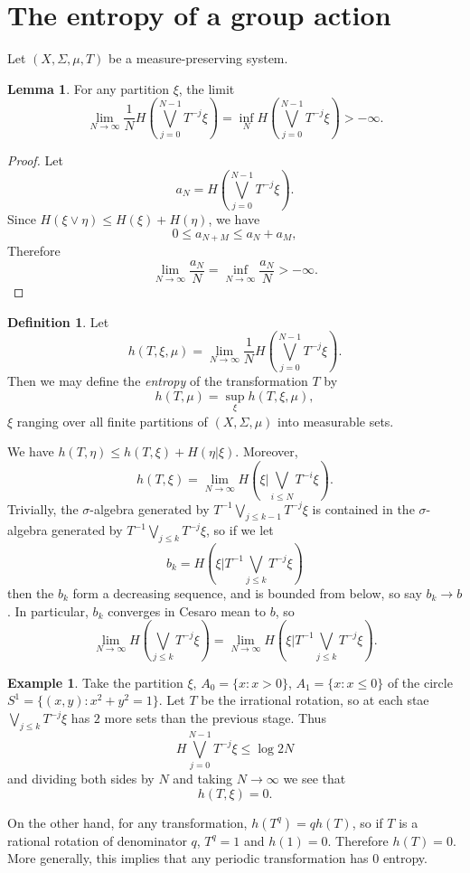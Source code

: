 \documentclass[12pt]{report}
\newcommand{\dfn}[1]{\emph{#1}\index{#1}}
\theoremstyle{definition}
\newtheorem{lemma}[theorem]{Lemma}
\newtheorem{definition}[theorem]{Definition}
\newtheorem{example}[theorem]{Example}
\begin{document}
\section{The entropy of a group action}
Let $(X, \Sigma, \mu, T)$ be a measure-preserving system.
\begin{lemma}
For any partition $\xi$, the limit
$$\lim_{N \to \infty} \frac{1}{N} H\left(\bigvee_{j=0}^{N-1} T^{-j}\xi\right) = \inf_N H\left(\bigvee_{j=0}^{N-1} T^{-j}\xi\right) > -\infty.
$$
\end{lemma}
\begin{proof}
Let
$$a_N = H\left(\bigvee_{j=0}^{N-1} T^{-j}\xi\right).$$
Since $H(\xi \vee \eta) \leq H(\xi) + H(\eta)$, we have
$$0 \leq a_{N+M} \leq a_N + a_M,$$
Therefore
$$\lim_{N \to \infty} \frac{a_N}{N} = \inf_{N \to \infty} \frac{a_N}{N} > -\infty.$$
\end{proof}

\begin{definition}
Let
$$h(T, \xi, \mu) = \lim_{N \to \infty} \frac{1}{N}H\left(\bigvee_{j=0}^{N-1} T^{-j}\xi\right).$$
Then we may define the \dfn{entropy} of the transformation $T$ by
$$h(T, \mu) = \sup_\xi h(T, \xi, \mu),$$
$\xi$ ranging over all finite partitions of $(X, \Sigma, \mu)$ into measurable sets.
\end{definition}
We have $h(T, \eta) \leq h(T, \xi) + H(\eta|\xi)$. Moreover,
$$h(T, \xi) = \lim_{N \to \infty} H(\xi|\bigvee_{i\leq N} T^{-i}\xi).$$
Trivially, the $\sigma$-algebra generated by $T^{-1}\bigvee_{j\leq k-1}T^{-j}\xi$ is contained in the $\sigma$-algebra generated by $T^{-1}\bigvee_{j\leq k} T^{-j}\xi$, so if we let
$$b_k = H(\xi|T^{-1}\bigvee_{j \leq k}T^{-j}\xi)$$
then the $b_k$ form a decreasing sequence, and is bounded from below, so say $b_k \to b$. In particular, $b_k$ converges in Cesaro mean to $b$, so
$$\lim_{N \to \infty} H(\bigvee_{j \leq k} T^{-j}\xi) = \lim_{N \to \infty} H(\xi|T^{-1}\bigvee_{j \leq k}T^{-j}\xi).$$

\begin{example}
Take the partition $\xi$, $A_0 = \{x: x > 0\}$, $A_1 = \{x: x \leq 0\}$ of the circle $S^1 = \{(x, y): x^2 + y^2 = 1\}$. Let $T$ be the irrational rotation, so at each stae $\bigvee_{j\leq k} T^{-j}\xi$ has $2$ more sets than the previous stage. Thus
$$H\bigvee_{j=0}^{N-1} T^{-j}\xi \leq \log 2N$$
and dividing both sides by $N$ and taking $N \to \infty$ we see that
$$h(T, \xi) = 0.$$

On the other hand, for any transformation, $h(T^q) = qh(T)$, so if $T$ is a rational rotation of denominator $q$, $T^q = 1$ and $h(1) = 0$. Therefore $h(T) = 0$. More generally, this implies that any periodic transformation has $0$ entropy.
\end{example}
\end{document}
